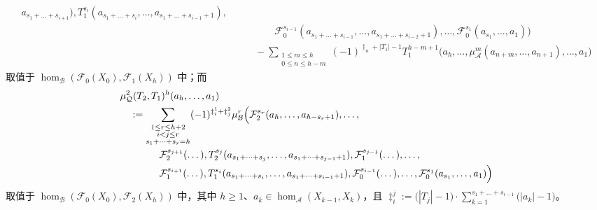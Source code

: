 \begin{Def}
\begin{itemize}
\begin{equation}
\begin{aligned}
            a_{s_1+\dots+s_{i+1}}),T_1^{s_i}(a_{s_1+\dots+s_i},\dots,
            a_{s_1+\dots+s_{i-1}+1}),\\
            &\qquad\qquad \mathcal F_0^{s_{i-1}}(a_{s_1+\dots+s_{i-1}},\dots,
            a_{s_1+\dots+s_{i-2}+1}),\dots,\mathcal F_0^{s_1}(a_{s_1},\dots,a_1)
            \Bigr)\\
            &\qquad-\sum_{\substack{1\le m\le h\\ 0\le n\le h-m}}
            (-1)^{\dagger_n+|T_1|-1}T_1^{h-m+1}\bigl(a_h,\dots,
            \mu^m_{\mathcal A}(a_{n+m},\dots,a_{n+1}),\dots,a_1\bigr)
          \end{aligned}
        \end{equation}
        取值于 $\hom_{\mathcal B}(\mathcal F_0(X_0),\mathcal F_1(X_h))$ 中；而
        \begin{equation}\label{eq:2.15}
          \begin{aligned}
            &\mu^2_{\mathcal Q}(T_2,T_1)^h(a_h,\dots,a_1)\\
            &\quad:=\sum_{\substack{1\le r\le h+2\\ i<j\le r\\
            s_1+\dots+s_r=h}}(-1)^{\ddagger^1_i+\ddagger^2_j}
            \mu^r_{\mathcal B}\Bigl(\mathcal F_2^{s_r}(a_h,\dots,a_{h-s_r+1}),\dots,\\
            &\qquad\qquad \mathcal F_2^{s_{j+1}}(\dots),T_2^{s_j}(a_{s_1+\dots+s_j},
            \dots,a_{s_1+\dots+s_{j-1}+1}),\mathcal F_1^{s_{j-1}}(\dots),\dots,\\
            &\qquad\qquad \mathcal F_1^{s_{i+1}}(\dots),T_1^{s_i}(a_{s_1+\dots+s_i},
            \dots,a_{s_1+\dots+s_{i-1}+1}),\mathcal F_0^{s_{i-1}}(\dots),\dots,
            \mathcal F_0^{s_1}(a_{s_1},\dots,a_1)\Bigr)
          \end{aligned}
        \end{equation}
        取值于 $\hom_{\mathcal B}(\mathcal F_0(X_0),\mathcal F_2(X_h))$ 中，其中
        $h\ge 1$、$a_k\in\hom_{\mathcal A}(X_{k-1},X_k)$，且
        $\ddagger^j_i:=\bigl(|T_j|-1\bigr)\cdot\sum_{k=1}^{s_1+\dots+s_{i-1}}
        \bigl(|a_k|-1\bigr)$。
\end{itemize}
\end{Def}

